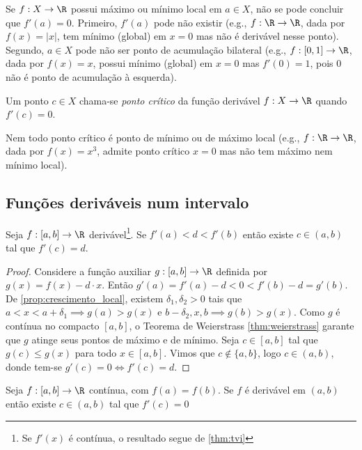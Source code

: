 \documentclass{article}
\begin{document}
\begin{rem}
    Se \(f: X \to \R\) possui máximo ou mínimo local em \(a \in X\), não se pode concluir que \(f'(a)=0\). Primeiro, \(f'(a)\) pode não existir (e.g., \(f: \R \to \R\), dada por \(f(x)=\vert x \vert\), tem mínimo (global) em \(x=0\) mas não é derivável nesse ponto). Segundo, \(a \in X\) pode não ser ponto de acumulação bilateral (e.g., \(f: [0,1] \to \R\), dada por \(f(x)= x\), possui mínimo (global) em \(x=0\) mas \(f'(0)=1\), pois \(0\) não é ponto de acumulação à esquerda).
\end{rem}

\begin{defn}
    Um ponto \(c \in X\) chama-se \emph{ponto crítico} da função derivável \(f: X \to \R\) quando \(f'(c) = 0\).
\end{defn}

\begin{rem}
    Nem todo ponto crítico é ponto de mínimo ou de máximo local (e.g., \(f: \R \to \R\), dada por \(f(x)=x^3\), admite ponto crítico \(x=0\) mas não tem máximo nem mínimo local).
\end{rem}

\subsection{Funções deriváveis num intervalo}

\begin{thm} [Darboux]
    Seja \(f: [a,b] \to \R\) derivável\footnote{Se \(f'(x)\) é contínua, o resultado segue de \eqref{thm:tvi}}. Se \(f'(a) < d < f'(b)\) então existe \(c \in (a,b)\) tal que \(f'(c) = d\).
\end{thm}

\begin{proof}
    Considere a função auxiliar \(g: [a,b] \to \R\) definida por \(g(x)=f(x)-d\cdot x\). Então \(g'(a)=f'(a)-d<0<f'(b)-d=g'(b)\). De \eqref{prop:crescimento_local}, existem \(\delta_1, \delta_2 > 0\) tais que \(a<x<a+\delta_1 \implies g(a)>g(x)\) e \(b-\delta_2,x,b \implies g(b)>g(x)\). Como \(g\) é contínua no compacto \([a,b]\), o Teorema de Weierstrass \eqref{thm:weierstrass} garante que \(g\) atinge seus pontos de máximo e de mínimo. Seja \(c \in [a,b]\) tal que \(g(c) \leq g(x)\) para todo \(x \in [a,b]\). Vimos que \(c \notin \{a,b\}\), logo \(c \in (a,b)\), donde tem-se \(g'(c) = 0 \iff f'(c) = d\).
\end{proof}

\begin{thm} [Rolle] \label{thm:rolle}
    Seja \(f: [a,b] \to \R\) contínua, com \(f(a)=f(b)\). Se \(f\) é derivável em \((a,b)\) então existe \(c \in (a,b)\) tal que \(f'(c)=0\)
\end{thm}
\end{document}
